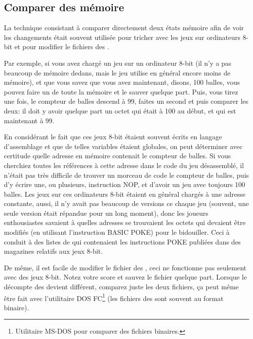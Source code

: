 \subsection{Comparer des  mémoire}
\label{snapshots_comparing}

La technique consistant à comparer directement deux états mémoire afin de voir les
changements était souvent utilisée pour tricher avec les jeux sur ordinateurs 8-bit
et pour modifier le fichiers des .

Par exemple, si vous avez chargé un jeu sur un ordinateur 8-bit (il n'y a pas beaucoup
de mémoire dedans, mais le jeu utilise en général encore moins de mémoire), et que
vous savez que vous avez maintenant, disons, 100 balles, vous pouvez faire un 
de toute la mémoire et le sauver quelque part. Puis, vous tirez une fois, le compteur
de balles descend à 99, faites un second  et puis comparer les deux:
il doit y avoir quelque part un octet qui était à 100 au début, et qui est maintenant
à 99.

En considérant le fait que ces jeux 8-bit étaient souvent écrits en langage d'assemblage
et que de telles variables étaient globales, on peut déterminer avec certitude quelle
adresse en mémoire contenait le compteur de balles. Si vous cherchiez toutes les références
à cette adresse dans le code du jeu désassemblé, il n'était pas très difficile de
trouver un morceau de code  le compteur de balles,
puis d'y écrire une, ou plusieurs, instruction \gls{NOP}, et d'avoir un jeu avec
toujours 100 balles.
Les jeux sur ces ordinateurs 8-bit étaient en général chargés à une adresse constante,
aussi, il n'y avait pas beaucoup de versions ce chaque jeu (souvent, une seule version
était répandue pour un long moment), donc les joueurs enthousiastes savaient à quelles
adresses se trouvaient les octets qui devaient être modifiés (en utilisant l'instruction
BASIC \gls{POKE}) pour le bidouiller. Ceci à conduit à des listes de  qui
contenaient les instructions \gls{POKE} publiées dans des magazines relatifs aux
jeux 8-bit.


De même, il est facile de modifier le fichier des , ceci ne fonctionne
pas seulement avec des jeux 8-bit. Notez votre score et sauvez le fichier quelque part.
Lorsque le décompte des  devient différent, comparez juste les
deux fichiers, ça peut même être fait avec l'utilitaire DOS FC\footnote{Utilitaire
MS-DOS pour comparer des fichiers binaires.} (les fichiers des 
sont souvent au format binaire).

